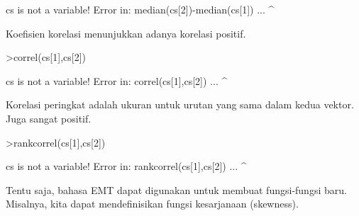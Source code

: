 \documentclass[12pt,arial,letterpaper]{book}
\begin{document}
\begin{eulercomment}
\begin{eulercomment}
\begin{eulercomment}
\begin{eulercomment}
\begin{eulercomment}
\begin{eulercomment}
\begin{eulercomment}
\begin{eulercomment}
\begin{eulercomment}
\begin{eulercomment}
\begin{eulercomment}
\begin{eulercomment}
\begin{eulercomment}
\begin{eulercomment}
\begin{eulercomment}
\begin{eulercomment}
\begin{eulercomment}
\begin{eulercomment}
\begin{eulercomment}
\begin{eulercomment}
\begin{eulercomment}
\begin{eulercomment}
\begin{eulercomment}
\begin{eulercomment}
\begin{eulercomment}
\begin{eulercomment}
\begin{eulercomment}
\begin{eulercomment}
\begin{eulercomment}
\begin{eulercomment}
\begin{eulercomment}
\begin{eulercomment}
\begin{eulerprompt}
\end{eulerprompt}
\begin{euleroutput}
  cs is not a variable!
  Error in:
  median(cs[2])-median(cs[1]) ...
              ^
\end{euleroutput}
\begin{eulercomment}
Koefisien korelasi menunjukkan adanya korelasi positif.
\end{eulercomment}
\begin{eulerprompt}
>correl(cs[1],cs[2])
\end{eulerprompt}
\begin{euleroutput}
  cs is not a variable!
  Error in:
  correl(cs[1],cs[2]) ...
              ^
\end{euleroutput}
\begin{eulercomment}
Korelasi peringkat adalah ukuran untuk urutan yang sama dalam kedua
vektor. Juga sangat positif.
\end{eulercomment}
\begin{eulerprompt}
>rankcorrel(cs[1],cs[2])
\end{eulerprompt}
\begin{euleroutput}
  cs is not a variable!
  Error in:
  rankcorrel(cs[1],cs[2]) ...
                  ^
\end{euleroutput}
\begin{eulercomment}
Tentu saja, bahasa EMT dapat digunakan untuk membuat fungsi-fungsi
baru. Misalnya, kita dapat mendefinisikan fungsi kesarjanaan
(skewness).


\end{eulercomment}
\end{eulercomment}
\end{eulercomment}
\end{eulercomment}
\end{eulercomment}
\end{eulercomment}
\end{eulercomment}
\end{eulercomment}
\end{eulercomment}
\end{eulercomment}
\end{eulercomment}
\end{eulercomment}
\end{eulercomment}
\end{eulercomment}
\end{eulercomment}
\end{eulercomment}
\end{eulercomment}
\end{eulercomment}
\end{eulercomment}
\end{eulercomment}
\end{eulercomment}
\end{eulercomment}
\end{eulercomment}
\end{eulercomment}
\end{eulercomment}
\end{eulercomment}
\end{eulercomment}
\end{eulercomment}
\end{eulercomment}
\end{eulercomment}
\end{eulercomment}
\end{eulercomment}
\end{eulercomment}
\end{document}
